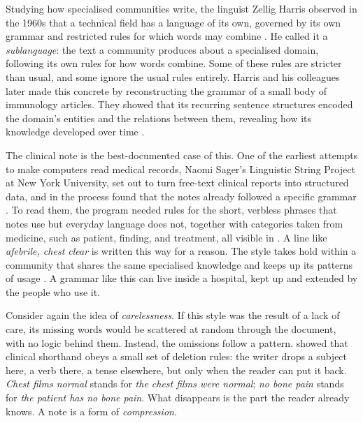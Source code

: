 \begin{reviewread}
Studying how specialised communities write, the linguist Zellig Harris observed in the 1960s that a technical field has a language of its own, governed by its own grammar and restricted rules for which words may combine \citep{harris_mathematical_1968}.
He called it a \emph{sublanguage}: the text a community produces about a specialised domain, following its own rules for how words combine.
Some of these rules are stricter than usual, and some ignore the usual rules entirely.
Harris and his colleagues later made this concrete by reconstructing the grammar of a small body of immunology articles.
They showed that its recurring sentence structures encoded the domain's entities and the relations between them, revealing how its knowledge developed over time \citep{harris_immunology_1989}.
\end{reviewread}

\begin{reviewread}
The clinical note is the best-documented case of this.
One of the earliest attempts to make computers read medical records, Naomi Sager's Linguistic String Project at New York University, set out to turn free-text clinical reports into structured data, and in the process found that the notes already followed a specific grammar \citep{sager_nlip_1981,sager_mlp_1987}.
To read them, the program needed rules for the short, verbless phrases that notes use but everyday language does not, together with categories taken from medicine, such as patient, finding, and treatment, all visible in .
A line like \emph{afebrile, chest clear} is written this way for a reason.
The style takes hold within a community that shares the same specialised knowledge and keeps up its patterns of usage \citep{kittredge_sublanguages_1982}.
A grammar like this can live inside a hospital, kept up and extended by the people who use it.
\end{reviewread}

\begin{reviewread}
Consider again the idea of \emph{carelessness}.
If this style was the result of a lack of care, its missing words would be scattered at random through the document, with no logic behind them.
Instead, the omissions follow a pattern.
\citet{anderson_compression_1975} showed that clinical shorthand obeys a small set of deletion rules: the writer drops a subject here, a verb there, a tense elsewhere, but only when the reader can put it back.
\emph{Chest films normal} stands for \emph{the chest films were normal}; \emph{no bone pain} stands for \emph{the patient has no bone pain}.
What disappears is the part the reader already knows.
A note is a form of \emph{compression}.
\end{reviewread}

